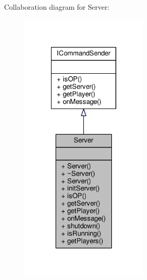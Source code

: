 Collaboration diagram for Server\-:
\nopagebreak
\begin{figure}[H]
\begin{center}
\leavevmode
\includegraphics[width=174pt]{class_server__coll__graph}
\end{center}
\end{figure}
